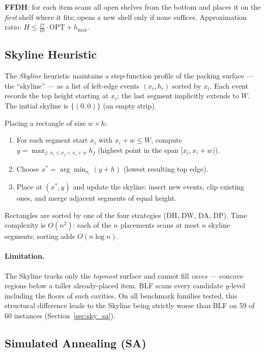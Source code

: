 \documentclass[11pt,a4paper]{article}
\begin{document}
\textbf{FFDH}: for each item scans all open shelves from the bottom and
places it on the \emph{first} shelf where it fits; opens a new shelf only if
none suffices.
Approximation ratio: $H \le \tfrac{17}{10} \cdot \mathrm{OPT} + h_{\max}$.

\subsection{Skyline Heuristic}

The \emph{Skyline} heuristic \cite{Burke2004} maintains a step-function
profile of the packing surface — the ``skyline'' — as a list of left-edge
events $(x_i, h_i)$ sorted by $x_i$.
Each event records the top height starting at $x_i$; the last segment
implicitly extends to $W$.
The initial skyline is $\{(0,0)\}$ (an empty strip).

Placing a rectangle of size $w \times h$:
\begin{enumerate}
  \item For each segment start $x_i$ with $x_i + w \le W$, compute
        $y = \max_{j:\, x_i \le x_j < x_i+w} h_j$ (highest point in
        the span $[x_i, x_i{+}w)$).
  \item Choose $x^* = \arg\min_{x_i}(y + h)$ (lowest resulting top edge).
  \item Place at $(x^*, y)$ and update the skyline: insert new events,
        clip existing ones, and merge adjacent segments of equal height.
\end{enumerate}
Rectangles are sorted by one of the four strategies (DH, DW, DA, DP).
Time complexity is $O(n^2)$: each of the $n$ placements scans at most $n$
skyline segments; sorting adds $O(n \log n)$.

\paragraph{Limitation.}
The Skyline tracks only the \emph{topmost} surface and cannot fill
\emph{caves} — concave regions below a taller already-placed item.
BLF scans every candidate $y$-level including the floors of such cavities.
On all benchmark families tested, this structural difference leads to the
Skyline being strictly worse than BLF on 59 of 60 instances
(Section~\ref{sec:sky_sa}).

\subsection{Simulated Annealing (SA)}
\end{document}
